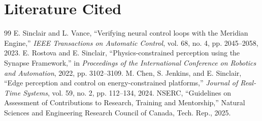 \documentclass[12pt, letterpaper]{article}
\begin{document}
\section{Literature Cited}
\begin{thebibliography}{99}
 E. Sinclair and L. Vance, ``Verifying neural control loops with the Meridian Engine,'' \emph{IEEE Transactions on Automatic Control}, vol. 68, no. 4, pp. 2045--2058, 2023.
 E. Rostova and E. Sinclair, ``Physics-constrained perception using the Synapse Framework,'' in \emph{Proceedings of the International Conference on Robotics and Automation}, 2022, pp. 3102--3109.
 M. Chen, S. Jenkins, and E. Sinclair, ``Edge perception and control on energy-constrained platforms,'' \emph{Journal of Real-Time Systems}, vol. 59, no. 2, pp. 112--134, 2024.
 NSERC, ``Guidelines on Assessment of Contributions to Research, Training and Mentorship,'' Natural Sciences and Engineering Research Council of Canada, Tech. Rep., 2025.
\end{thebibliography}
\end{document}
